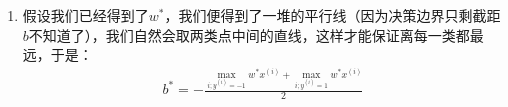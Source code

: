 \begin{enumerate}
	\item 假设我们已经得到了$w^*$，我们便得到了一堆的平行线（因为决策边界只剩截距$b$不知道了），我们自然会取两类点中间的直线，这样才能保证离每一类都最远，于是：
	\begin{align}
		b^* = - \frac{\max_{i;y^{(i)}=-1}w^*x^{(i)} + \max_{i;y^{(i)}=1}w^*x^{(i)}}{2}
	\end{align}


\end{enumerate}

















